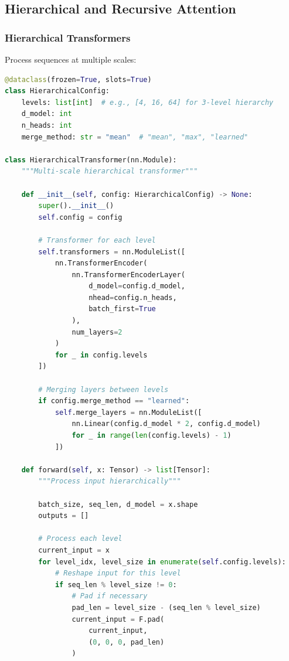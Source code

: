 \subsection{Hierarchical and Recursive Attention}

\subsubsection{Hierarchical Transformers}

Process sequences at multiple scales:

\begin{lstlisting}[language=Python, caption=Hierarchical Transformer Architecture]
@dataclass(frozen=True, slots=True)
class HierarchicalConfig:
    levels: list[int]  # e.g., [4, 16, 64] for 3-level hierarchy
    d_model: int
    n_heads: int
    merge_method: str = "mean"  # "mean", "max", "learned"

class HierarchicalTransformer(nn.Module):
    """Multi-scale hierarchical transformer"""

    def __init__(self, config: HierarchicalConfig) -> None:
        super().__init__()
        self.config = config

        # Transformer for each level
        self.transformers = nn.ModuleList([
            nn.TransformerEncoder(
                nn.TransformerEncoderLayer(
                    d_model=config.d_model,
                    nhead=config.n_heads,
                    batch_first=True
                ),
                num_layers=2
            )
            for _ in config.levels
        ])

        # Merging layers between levels
        if config.merge_method == "learned":
            self.merge_layers = nn.ModuleList([
                nn.Linear(config.d_model * 2, config.d_model)
                for _ in range(len(config.levels) - 1)
            ])

    def forward(self, x: Tensor) -> list[Tensor]:
        """Process input hierarchically"""

        batch_size, seq_len, d_model = x.shape
        outputs = []

        # Process each level
        current_input = x
        for level_idx, level_size in enumerate(self.config.levels):
            # Reshape input for this level
            if seq_len % level_size != 0:
                # Pad if necessary
                pad_len = level_size - (seq_len % level_size)
                current_input = F.pad(
                    current_input,
                    (0, 0, 0, pad_len)
                )


\end{lstlisting}
